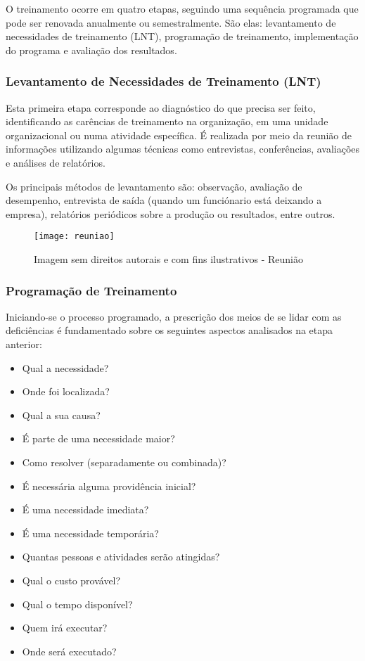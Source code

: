 \documentclass[12pt]{article}
\begin{document}
O treinamento ocorre em quatro etapas, seguindo uma sequência programada que pode ser renovada anualmente ou semestralmente. São elas: levantamento de necessidades de treinamento (LNT), programação de treinamento, implementação do programa e avaliação dos resultados.

\subsubsection{Levantamento de Necessidades de Treinamento (LNT)}

Esta primeira etapa corresponde ao diagnóstico do que precisa ser feito, identificando as carências de treinamento na organização, em uma unidade organizacional ou numa atividade específica. É realizada por meio da reunião de informações utilizando algumas técnicas como entrevistas, conferências, avaliações e análises de relatórios.

Os principais métodos de levantamento são: observação, avaliação de desempenho, entrevista de saída (quando um funciónario está deixando a empresa), relatórios periódicos sobre a produção ou resultados, entre outros.

\begin{figure}[h]
	\centering
	\texttt{[image: reuniao]}
	\caption{Imagem sem direitos autorais e com fins ilustrativos - Reunião}
	\label{fig:mesh1}
\end{figure}

\subsubsection{Programação de Treinamento}
Iniciando-se o processo programado, a prescrição dos meios de se lidar com as deficiências é fundamentado sobre os seguintes aspectos analisados na etapa anterior: 
\begin{itemize}
\item Qual a necessidade?
\item Onde foi localizada?
\item Qual a sua causa?
\item É parte de uma necessidade maior?
\item Como resolver (separadamente ou combinada)?
\item É necessária alguma providência inicial?
\item É uma necessidade imediata?
\item É uma necessidade temporária?
\item Quantas pessoas e atividades serão atingidas?
\item Qual o custo provável?
\item Qual o tempo disponível?
\item Quem irá executar?
\item Onde será executado?
\end{itemize}
\end{document}
